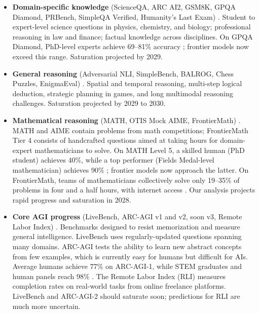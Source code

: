 \documentclass[letterpaper,twocolumn]{article}
\begin{document}
\begin{itemize}
    \item \textbf{Domain-specific knowledge} (ScienceQA, ARC AI2, GSM8K, GPQA Diamond, PRBench, SimpleQA Verified, Humanity's Last Exam) \citep{lu_learn_2022,clark_think_2018,cobbe_training_2021,rein_gpqa_2023,wang_mmlu-pro_2024,akyurek_prbench_2025,haas_simpleqa_2025,phan_humanitys_2025}. Student to expert-level science questions in physics, chemistry, and biology; professional reasoning in law and finance; factual knowledge across disciplines. On GPQA Diamond, PhD-level experts achieve 69--81\% accuracy \citep{rein_gpqa_2023}; frontier models now exceed this range. Saturation projected by 2029.
    \item \textbf{General reasoning} (Adversarial NLI, SimpleBench, BALROG, Chess Puzzles, EnigmaEval) \citep{nie_adversarial_2020, philip_simplebench_2024,paglieri_balrog_2025,epoch_ai_chess_2025,wang_enigmaeval_2025}. Spatial and temporal reasoning, multi-step logical deduction, strategic planning in games, and long multimodal reasoning challenges. Saturation projected by 2029 to 2030.
    \item \textbf{Mathematical reasoning} (MATH, OTIS Mock AIME, FrontierMath) \citep{hendrycks_measuring_2021,epoch_ai_otis_2025,epoch_ai_frontiermath_2025}. MATH and AIME contain problems from math competitions; FrontierMath Tier 4 consists of handcrafted questions aimed at taking hours for domain-expert mathematicians to solve. On MATH Level 5, a skilled human (PhD student) achieves 40\%, while a top performer (Fields Medal-level mathematician) achieves 90\% \citep{hendrycks_measuring_2021}; frontier models now approach the latter. On FrontierMath, teams of mathematicians collectively solve only 19--35\% of problems in four and a half hours, with internet access \citep{epoch_ai_frontiermath_2025}. Our analysis projects rapid progress and saturation in 2028.
    \item \textbf{Core AGI progress} (LiveBench, ARC-AGI v1 and v2, soon v3, Remote Labor Index) \citep{white_livebench_2025,chollet_measure_2019, arc_prize_arc-agi-1_2019,arc_prize_arc-agi-2_2025,arc_prize_arc-agi-3_2025,mazeika_remote_2025}. Benchmarks designed to resist memorization and measure general intelligence. LiveBench uses regularly-updated questions spanning many domains. ARC-AGI tests the ability to learn new abstract concepts from few examples, which is currently easy for humans but difficult for AIs. Average humans achieve 77\% on ARC-AGI-1, while STEM graduates and human panels reach 98\% \citep{arc_prize_arc-agi-1_2019}. The Remote Labor Index (RLI) measures completion rates on real-world tasks from online freelance platforms. LiveBench and ARC-AGI-2 should saturate soon; predictions for RLI are much more uncertain.
\end{itemize}
\end{document}
